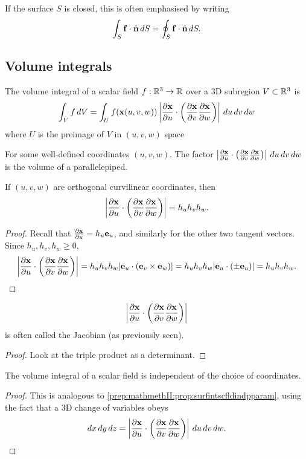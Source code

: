 \documentclass[10pt, a4paper]{article}
\begin{document}
If the surface $S$ is closed,
this is often emphasised by writing
\[
\int_{S}\mbf{f} \cdot \hat{\mbf{n}}\,dS = \oint_{S}\mbf{f}\cdot\hat{\mbf{n}}\,dS.
\]


\subsection{Volume integrals}

\begin{definition}
    The volume integral of a scalar field $f : \R ^ 3 \to \R$ over a $3$D subregion $V \subset \R ^ 3$ is
    \[
    \int_{V}f\,dV = \int_{U}f(\mbf{x}(u, v, w))\left|\pd[\mbf{x}]{u}\cdot\left(\pd[\mbf{x}]{v}\pd[\mbf{x}]{w}\right)\right|\,du\,dv\,dw
    \]
    where $U$ is the preimage of $V$ in $(u, v, w)$ space
\end{definition}

For some well-defined coordinates $(u, v, w)$.
The factor $\left|\pd[\mbf{x}]{u}\cdot\left(\pd[\mbf{x}]{v}\pd[\mbf{x}]{w}\right)\right|\,du\,dv\,dw$ is the volume of a parallelepiped.

\begin{proposition}
    If $(u, v, w)$ are orthogonal curvilinear coordinates,
    then
    \[
    \left|\pd[\mbf{x}]{u}\cdot\left(\pd[\mbf{x}]{v}\pd[\mbf{x}]{w}\right)\right| = h_uh_vh_w.
    \]

    \begin{proof}
        Recall that $\pd[\mbf{x}]{u} = h_u\mbf{e}_u$,
        and similarly for the other two tangent vectors.
        Since $h_u, h_v, h_w \geq 0$,
        \[
        \left|\pd[\mbf{x}]{u}\cdot\left(\pd[\mbf{x}]{v}\pd[\mbf{x}]{w}\right)\right| = h_uh_vh_w|\mbf{e}_u \cdot (\mbf{e}_v \times \mbf{e}_w)| = h_uh_vh_w|\mbf{e}_u \cdot (\pm\mbf{e}_u)| = h_uh_vh_w.
        \]
    \end{proof}
\end{proposition}

\begin{remark}
    \[
    \left|\pd[\mbf{x}]{u}\cdot\left(\pd[\mbf{x}]{v}\pd[\mbf{x}]{w}\right)\right|
    \]
    is often called the Jacobian
    (as previously seen).

    \begin{proof}
        Look at the triple product as a determinant.
    \end{proof}
\end{remark}

\begin{proposition}
    The volume integral of a scalar field is independent of the choice of coordinates.

    \begin{proof}
        This is analogous to \autoref{prep:mathmethII:prop:surfintscfldindpparam},
        using the fact that a $3$D change of variables obeys
        \[
        dx\,dy\,dz = \left|\pd[\mbf{x}]{u}\cdot\left(\pd[\mbf{x}]{v}\pd[\mbf{x}]{w}\right)\right|\,du\,dv\,dw.
        \]
    \end{proof}
\end{proposition}
\end{document}
